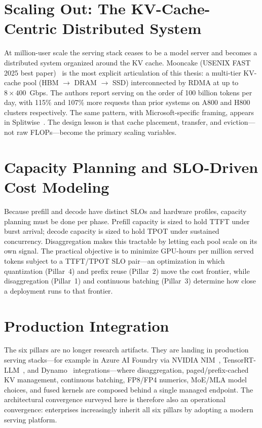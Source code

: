 \documentclass[11pt]{article}
\begin{document}
\section{Scaling Out: The KV-Cache-Centric Distributed System}
At million-user scale the serving stack ceases to be a model server and becomes a distributed system organized
around the KV cache. Mooncake (USENIX FAST 2025 best paper)~\cite{mooncake} is the most explicit articulation
of this thesis: a multi-tier KV-cache pool (HBM $\to$ DRAM $\to$ SSD) interconnected by RDMA at up to
$8\times400$~Gbps. The authors report serving on the order of 100 billion tokens per day, with 115\% and 107\%
more requests than prior systems on A800 and H800 clusters respectively. The same pattern, with
Microsoft-specific framing, appears in Splitwise~\cite{splitwise}. The design lesson is that cache placement,
transfer, and eviction---not raw FLOPs---become the primary scaling variables.

\section{Capacity Planning and SLO-Driven Cost Modeling}
Because prefill and decode have distinct SLOs and hardware profiles, capacity planning must be done per phase.
Prefill capacity is sized to hold TTFT under burst arrival; decode capacity is sized to hold TPOT under
sustained concurrency. Disaggregation makes this tractable by letting each pool scale on its own signal. The
practical objective is to minimize GPU-hours per million served tokens subject to a TTFT/TPOT SLO pair---an
optimization in which quantization (Pillar~4) and prefix reuse (Pillar~2) move the cost frontier, while
disaggregation (Pillar~1) and continuous batching (Pillar~3) determine how close a deployment runs to that
frontier.

\section{Production Integration}
The six pillars are no longer research artifacts. They are landing in production serving stacks---for example
in Azure AI Foundry via NVIDIA NIM~\cite{nim}, TensorRT-LLM~\cite{trtllm}, and Dynamo~\cite{dynamo}
integrations---where disaggregation, paged/prefix-cached KV management, continuous batching, FP8/FP4 numerics,
MoE/MLA model choices, and fused kernels are composed behind a single managed endpoint. The architectural
convergence surveyed here is therefore also an operational convergence: enterprises increasingly inherit all
six pillars by adopting a modern serving platform.
\end{document}

